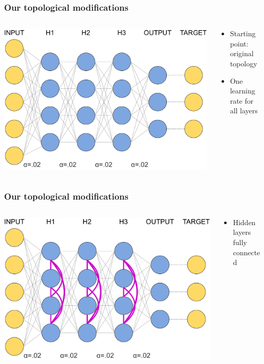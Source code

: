 \documentclass[pdf]{beamer}
\begin{document}
\begin{frame}
	\frametitle{Our topological modifications}
	\begin{columns}
		\begin{column}{.6\textwidth}
			\includegraphics[width=\textwidth]{figures/topology_changes_step1.pdf}
		\end{column}
		\begin{column}{.4\textwidth}
			\begin{itemize}
			\item Starting point: original topology
			\item One learning rate for all layers
			\end{itemize}
		\end{column}
	\end{columns}
\end{frame}
\begin{frame}
	\frametitle{Our topological modifications}
	\begin{columns}
		\begin{column}{.6\textwidth}
			\includegraphics[width=\textwidth]{figures/topology_changes_step2.pdf}
		\end{column}
		\begin{column}{.4\textwidth}
			\begin{itemize}
			\item Hidden layers fully connected
			\end{itemize}
		\end{column}
	\end{columns}
\end{frame}
\end{document}
